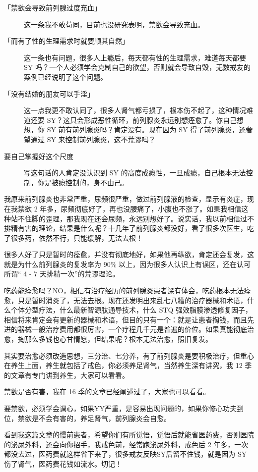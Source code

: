 \documentclass{ctexart}
\begin{document}
\begin{description}
    \item[「禁欲会导致前列腺过度充血」] 这一条我不敢苟同，目前也没研究表明，禁欲会导致充血。
    \item[「而有了性的生理需求时就要顺其自然」] 这一条也有问题，很多人上瘾后，每天都有性的生理需求，难道每天都要 SY 吗？一个人必须学会克制自己的欲望，否则就会导致自毁，无数戒友的案例已经说明了这个问题。
    \item[「没有结婚的朋友可以手淫」] 这一点我更不敢认同了，很多人肾气都亏损了，根本伤不起了，这种情况难道还要 SY？这只会形成恶性循环，前列腺炎永远别想痊愈了。你自己想想，你 SY 前有前列腺炎吗？肯定没有。现在因为 SY 得了前列腺炎，还奢望通过 SY 来控制前列腺炎，这不荒谬吗？
    \item[要自己掌握好这个尺度] 写这句话的人肯定没认识到 SY 的高度成瘾性，一旦成瘾，自己根本无法控制，你是被瘾控制的，身不由己。
\end{description}

我原来前列腺炎也非常严重，尿频很严重，做过前列腺液的检查，显示有炎症，现在我禁欲 2 年多，尿频彻底好了，再也没腰痛了，小腹也不涨了。如果我相信这种站不住脚的歪理，那我现在还会尿频，永远别想好了。说实话，我以前相信过不排精有害的理论，结果是什么呢？十几年了前列腺炎都没好，看了很多次医生，吃了很多药，依然不行，只能缓解，无法去根！

很多人好了只是暂时的痊愈，并没有彻底地好，如果他再纵欲，肯定还会复发，这就是为什么前列腺炎的复发率为 90\% 以上，因为很多人认识上有误区，还在认可所谓“ 4 - 7 天排精一次”的荒谬理论。

吃药能痊愈吗？NO，相信有治疗经历的前列腺炎患者深有体会，吃药根本无法痊愈，只是暂时消炎了，无法去根。现在还发明出来乱七八糟的治疗器械和术语，什么个体分型疗法，什么最新智源肽通导技术，什么 STQ 强效脂膜渗透修复因子，相信将来肯定会有更新的器械和术语，但目的只有一个：就是让患者掏钱，而且先进的器械一般治疗费用都很厉害，一个疗程几千元是普遍的价位。如果真能彻底治愈，掏那么多钱也心甘情愿，但结果呢？根本无法治愈，照旧复发。

其实要治愈必须改造思想，三分治、七分养，有了前列腺炎是要积极治疗，但重心在养生上面，养生就包括了戒色，你必须养足肾气，当然养生深有讲究，我 12 季的文章有专门讲到养生，大家可以看看。

禁欲是否有害，我在 16 季的文章已经阐述过了，大家也可以看看。

要禁欲，必须学会调心，如果YY严重，是容易出现问题的，如果你修心功夫到位，禁欲是不会有害的，养足肾气，前列腺炎会自愈。

看到我这篇文章的慢前患者，希望你们有所觉悟，觉悟后就能省医药费，否则医院的泌尿外科，还会向你招手，我戒色前，经常跑泌尿外科，戒色后 2 年多，一次都没去过，医药费就这样省下来了，很多戒友反映SY后留不住钱，就是因为 SY 伤了肾气，医药费花钱如流水。切记！
\end{document}
